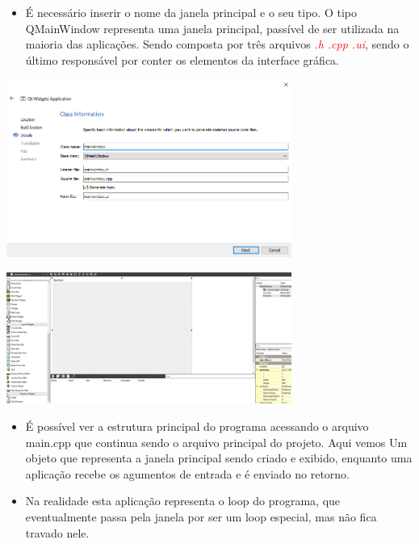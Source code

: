 \documentclass[10pt]{beamer}
\theoremstyle{remark}
\theoremstyle{definition}
\newcommand{\code}[1]{\textcolor{red} {\textit{#1}}} %
\begin{document}
\begin{frame}[allowframebreaks]
	\begin{itemize}
		\item É necessário inserir o nome da janela principal e o seu tipo. O tipo QMainWindow representa uma janela principal, passível de ser utilizada na maioria das aplicações. Sendo composta por três arquivos \code{.h .cpp .ui}, sendo o último responsável por conter os elementos da interface gráfica.
	\end{itemize}
	
	\begin{center}
		\includegraphics[width=0.7\textwidth]{images/29.png}
	\end{center}
	
	\framebreak
	
	\begin{center}
		\includegraphics[width=0.7\textwidth]{images/31.png}
	\end{center}
		
	\framebreak

	\begin{itemize}
		\item É possível ver a estrutura principal do programa acessando o arquivo main.cpp que continua sendo o arquivo principal do projeto. Aqui vemos Um objeto que representa a janela principal sendo criado e exibido, enquanto uma aplicação recebe os agumentos de entrada e é enviado no retorno.
		
		\item Na realidade esta aplicação representa o loop do programa, que eventualmente passa pela janela por ser um loop especial, mas não fica travado nele.
	\end{itemize}
	

\end{frame}
\end{document}
